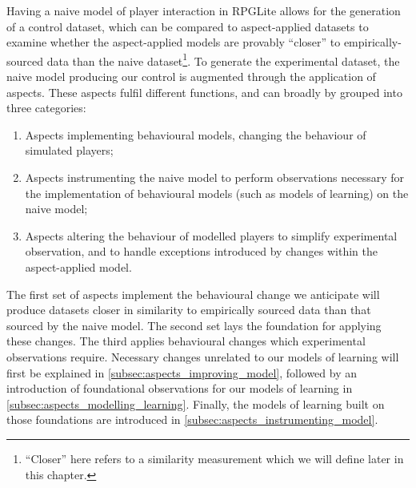Having a naive model of player interaction in RPGLite allows for the generation
of a control dataset, which can be compared to aspect-applied datasets to
examine whether the aspect-applied models are provably ``closer'' to
empirically-sourced data than the naive dataset\footnote{``Closer'' here refers
to a similarity measurement which we will define later in this chapter.}. To
generate the experimental dataset, the naive model producing our control is
augmented through the application of aspects. These aspects fulfil different
functions, and can broadly by grouped into three categories:

\begin{enumerate}
  \item Aspects implementing behavioural models, changing the behaviour of
  simulated players;
  \item Aspects instrumenting the naive model to perform observations necessary
  for the implementation of behavioural models (such as models of learning) on
  the naive model;
  \item Aspects altering the behaviour of modelled players to simplify
  experimental observation, and to handle exceptions introduced by changes
  within the aspect-applied model.
\end{enumerate}

The first set of aspects implement the behavioural change we anticipate will
produce datasets closer in similarity to empirically sourced data than that
sourced by the naive model. The second set lays the foundation for applying
these changes. The third applies behavioural changes which experimental
observations require. Necessary changes unrelated to our models of learning will
first be explained in \cref{subsec:aspects_improving_model}, followed by an
introduction of foundational observations for our models of learning in
\cref{subsec:aspects_modelling_learning}. Finally, the models of learning built
on those foundations are introduced in
\cref{subsec:aspects_instrumenting_model}.

